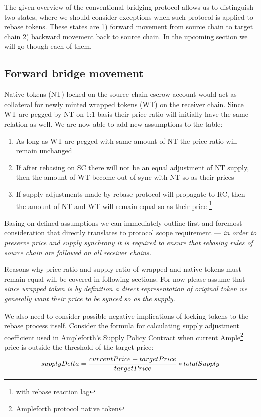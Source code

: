 \documentclass{article}
\newcommand{\astfootnote}[1]{%
	\let\oldthefootnote=\thefootnote%
	\setcounter{footnote}{0}%
	\renewcommand{\thefootnote}{\fnsymbol{footnote}}%
	\footnote{#1}%
	\let\thefootnote=\oldthefootnote%
}
\begin{document}
The given overview of the conventional bridging protocol allows us to distinguish two states, where we should consider exceptions when such protocol is applied to rebase tokens. These states are 1) forward movement from source chain to target chain 2) backward movement back to source chain. In the upcoming section we will go though each of them.

\subsection{Forward bridge movement}

Native tokens (NT) locked on the source chain escrow account would act as collateral for newly minted wrapped tokens (WT) on the receiver chain. Since WT are pegged by NT on 1:1 basis their price ratio will initially have the same relation as well. We are now able to add new assumptions to the table:

\begin{enumerate}
	\item As long as WT are pegged with same amount of NT the price ratio will remain unchanged
	\item If after rebasing on SC there will not be an equal adjustment of NT supply, then the amount of WT become out of sync with NT so as their prices
	\item If supply adjustments made by rebase protocol will propagate to RC, then the amount of NT and WT will remain equal so as their price\astfootnote{with rebase reaction lag}
\end{enumerate}

Basing on defined assumptions we can immediately outline first and foremost consideration that directly translates to protocol scope requirement --- \textit{in order to preserve price and supply synchrony it is required to ensure that rebasing rules of source chain are followed on all receiver chains.}

Reasons why price-ratio and supply-ratio of wrapped and native tokens must remain equal will be covered in following sections. For now please assume that \textit{since wrapped token is by definition a direct representation of original token we generally want their price to be synced so as the supply.}

We also need to consider possible negative implications of locking tokens to the rebase process itself. Consider the formula for calculating supply adjustment coefficient used in Ampleforth's Supply Policy Contract \cite{kuo2019ampleforth} when current Ample\footnote{Ampleforth protocol native token} price is outside the threshold of the target price:
\[supplyDelta = \frac{currentPrice-targetPrice}{targetPrice}\ast\\totalSupply\]
\end{document}
